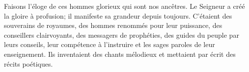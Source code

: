 Faisons l’éloge de ces hommes glorieux qui sont nos ancêtres.
Le Seigneur a créé la gloire à profusion; il manifeste sa grandeur depuis toujours.
C’étaient des souverains de royaumes, des hommes renommés pour leur puissance,
	des conseillers clairvoyants, des messagers de prophéties,
	des guides du peuple par leurs conseils, leur compétence à l’instruire
	et les sages paroles de leur enseignement.
Ils inventaient des chants mélodieux et mettaient par écrit des récits poétiques.
